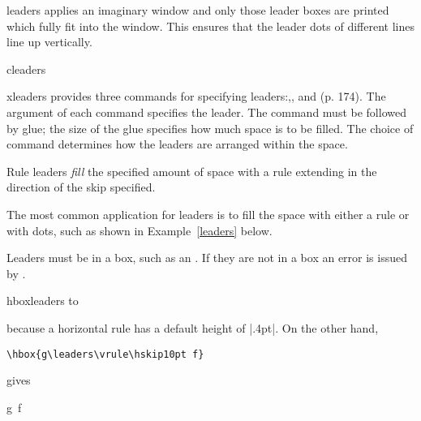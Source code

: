 \begin{docCommand}{leaders}{}
\tex applies an imaginary window and only those leader boxes are printed which fully fit into the window. This ensures that the leader dots of different lines line up vertically.
\end{docCommand}


\begin{docCommand}{cleaders}{}
\end{docCommand}

\begin{docCommand}{xleaders}{}
\tex  provides three commands for specifying leaders:,,
and (p. 174). The argument of each command specifies the
leader. The command must be followed by glue; the size of the glue specifies
how much space is to be filled. The choice of command determines how
the leaders are arranged within the space.
\end{docCommand}

Rule leaders \textit{fill} the specified amount of space with a rule extending in the direction of the skip
specified. 

The most common application for leaders is to fill the space with either a rule or with dots, such as shown in Example~\ref{leaders} below.


Leaders must be in a box, such as an . If they are not in a box an error is issued by \tex.

\begin{texexample}{}{hboxleaders}
\hbox to 
\end{texexample}

because a horizontal rule has a default height of |.4pt|. On the other hand,

\verb+\hbox{g\leaders\vrule\hskip10pt f}+

gives

\hbox{g\leaders\vrule\hskip10pt f}

